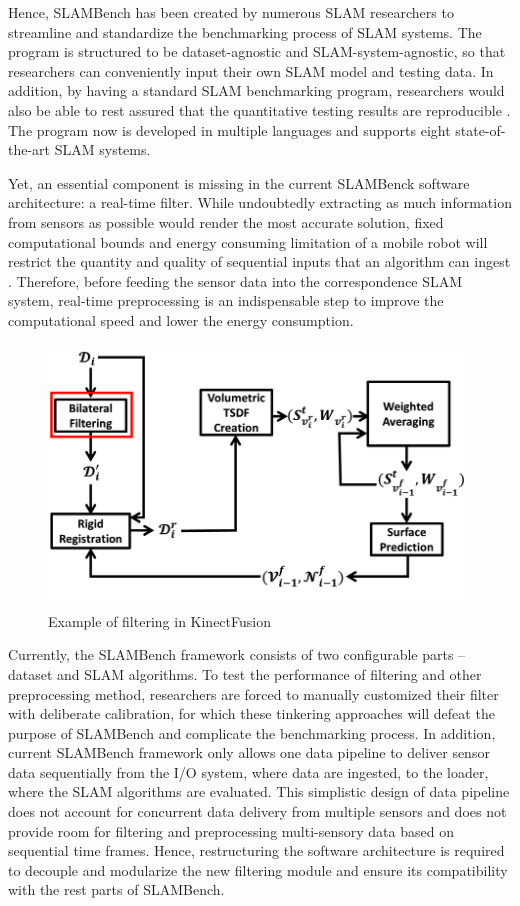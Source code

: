 Hence, SLAMBench has been created by numerous SLAM researchers to streamline and standardize the benchmarking process of SLAM systems. 
The program is structured to be dataset-agnostic and SLAM-system-agnostic, so that researchers can conveniently input their own SLAM model and testing data. 
In addition, by having a standard SLAM benchmarking program, researchers would also be able to rest assured that the quantitative testing results are reproducible \cite{bodin2018slambench2}. 
The program now is developed in multiple languages and supports eight state-of-the-art SLAM systems.

Yet, an essential component is missing in the current SLAMBenck software architecture: a real-time filter. 
While undoubtedly extracting as much information from sensors as possible would render the most accurate solution, fixed computational bounds and energy consuming limitation of a mobile robot will restrict the quantity and quality of sequential inputs that an algorithm can ingest \cite{strasdat2010real}. 
Therefore, before feeding the sensor data into the correspondence SLAM system, real-time preprocessing is an indispensable step to improve the computational speed and lower the energy consumption. 

\begin{figure}[h]
	\caption{Example of filtering in KinectFusion}
	\includegraphics[width=11cm]{figures/kinectfusion.png}
	\centering
\end{figure}

Currently, the SLAMBench framework consists of two configurable parts – dataset and SLAM algorithms. 
To test the performance of filtering and other preprocessing method, researchers are forced to manually customized their filter with deliberate calibration, for which these tinkering approaches will defeat the purpose of SLAMBench and complicate the benchmarking process. 
In addition, current SLAMBench framework only allows one data pipeline to deliver sensor data sequentially from the I/O system, where data are ingested, to the loader, where the SLAM algorithms are evaluated. 
This simplistic design of data pipeline does not account for concurrent data delivery from multiple sensors and does not provide room for filtering and preprocessing multi-sensory data based on sequential time frames. 
Hence, restructuring the software architecture is required to decouple and modularize the new filtering module and ensure its compatibility with the rest parts of SLAMBench.

